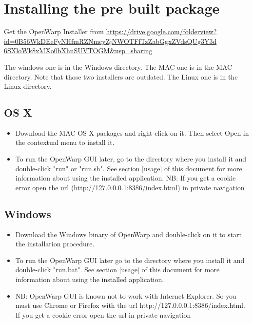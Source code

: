 \documentclass[12pt]{article}
\begin{document}
\section{Installing the pre built package}
\label{prebuilt}

Get the OpenWarp Installer from
\url{https://drive.google.com/folderview?id=0B56WkDEeFyNHfmRZNmcyZjNWOTFfTzZabGgxZVdsQUg3Y3d 6SXloWk8xMXo0bXhnSUVTOGM&usp=sharing}

The windows one is in the Windows directory. The MAC one is in the MAC directory. Note that those two installers are outdated.
The Linux one is in the Linux directory.
\subsection{OS X}

\begin{itemize}
	\item Download the MAC OS X packages and right-click on it. Then select Open in the contextual menu to install it.
\item To run the OpenWarp GUI later, go to the directory where you install it and double-click "run" or "run.sh". See section \ref{usage} of this document for more information about using the installed application.
NB:
If you get a cookie error open the url (http://127.0.0.0.1:8386/index.html) in private navigation
\end{itemize}

\subsection{Windows}

\begin{itemize}
	\item Download the Windows binary of OpenWarp and double-click on it to start the installation procedure.
 \item To run the OpenWarp GUI later go to the directory where you install it and double-click "run.bat". See section \ref{usage} of this document for more information about using the installed application.
\item NB: OpenWarp GUI is known not to work with Internet Explorer. So you must use Chrome or Firefox with the url http://127.0.0.0.1:8386/index.html.
If you get a cookie error open the url in private navigation
\end{itemize}
\end{document}
